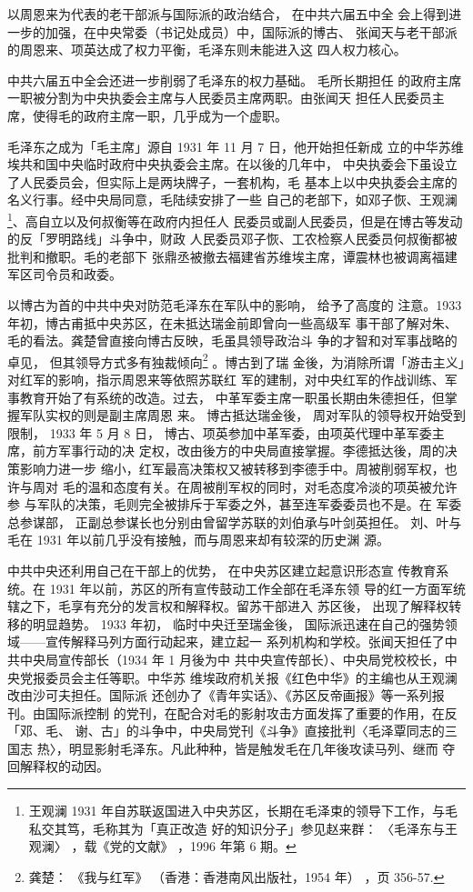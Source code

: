 以周恩来为代表的老干部派与国际派的政治结合，
在中共六届五中全
会上得到进一步的加强，在中央常委（书记处成员）中，国际派的博古、
张闻天与老干部派的周恩来、项英达成了权力平衡，毛泽东则未能进入这
四人权力核心。

中共六届五中全会还进一步削弱了毛泽东的权力基础。
毛所长期担任
的政府主席一职被分割为中央执委会主席与人民委员主席两职。由张闻天
担任人民委员主席，使得毛的政府主席一职，几乎成为一个虚职。

毛泽东之成为「毛主席」源自 1931 年 11 月 7 日，他开始担任新成
立的中华苏维埃共和国中央临时政府中央执委会主席。在以後的几年中，
中央执委会下虽设立了人民委员会，但实际上是两块牌子，一套机构，毛
基本上以中央执委会主席的名义行事。经中央局同意，毛陆续安排了一些
自己的老部下，如邓子恢、王观澜\footnote{ 王观澜 1931 年自苏联返国进入中央苏区，长期在毛泽束的领导下工作，与毛私交其笃，毛称其为「真正改造
好的知识分子」参见赵来群：
〈毛泽东与王观澜〉
，载《党的文献》
，1996 年第 6 期。}、高自立以及何叔衡等在政府内担任人
民委员或副人民委员，但是在博古等发动的反「罗明路线」斗争中，财政
人民委员邓子恢、工农检察人民委员何叔衡都被批判和撤职。毛的老部下
张鼎丞被撤去福建省苏维埃主席，谭震林也被调离福建军区司令员和政委。

以博古为首的中共中央对防范毛泽东在军队中的影响，
给予了高度的
注意。1933 年初，博古甫抵中央苏区，在未抵达瑞金前即曾向一些高级军
事干部了解对朱、毛的看法。龚楚曾直接向博古反映，毛虽具领导政治斗
争的才智和对军事战略的卓见，
但其领导方式多有独裁倾向\footnote{龚楚：
《我与红军》
（香港：香港南风出版社，1954 年）
，页 356-57.} 。博古到了瑞
金後，为消除所谓「游击主义」对红军的影响，指示周恩来等依照苏联红
军的建制，对中央红军的作战训练、军事教育开始了有系统的改造。过去，
中革军委主席一职虽长期由朱德担任，但掌握军队实权的则是副主席周恩
来。
博古抵达瑞金後，
周对军队的领导权开始受到限制，
1933 年 5 月 8 日，
博古、项英参加中革军委，由项英代理中革军委主席，前方军事行动的决
定权，改由後方的中央局直接掌握。李德抵达後，周的决策影响力进一步
缩小，红军最高决策权又被转移到李德手中。周被削弱军权，也许与周对
毛的温和态度有关。在周被削军权的同时，对毛态度冷淡的项英被允许参
与军队的决策，毛则完全被排斥于军委之外，甚至连军委委员也不是。在
军委总参谋部，
正副总参谋长也分别由曾留学苏联的刘伯承与叶剑英担任。
刘、叶与毛在 1931 年以前几乎没有接触，而与周恩来却有较深的历史渊
源。

 
中共中央还利用自己在干部上的优势，
在中央苏区建立起意识形态宣
传教育系统。在 1931 年以前，苏区的所有宣传鼓动工作全部在毛泽东领
导的红一方面军统辖之下，毛享有充分的发言权和解释权。留苏干部进入
苏区後，
出现了解释权转移的明显趋势。
1933 年初，
临时中央迁至瑞金後，
国际派迅速在自己的强势领域——宣传解释马列方面行动起来，建立起一
系列机构和学校。张闻天担任了中共中央局宣传部长（1934 年 1 月後为中
共中央宣传部长）、中央局党校校长，中央党报委员会主任等职。中华苏
维埃政府机关报《红色中华》的主编也从王观澜改由沙可夫担任。国际派
还创办了《青年实话》、《苏区反帝画报》等一系列报刊。由国际派控制
的党刊，在配合对毛的影射攻击方面发挥了重要的作用，在反「邓、毛、
谢、古」的斗争中，中央局党刊《斗争》直接批判〈毛泽覃同志的三国志
热〉，明显影射毛泽东。凡此种种，皆是触发毛在几年後攻读马列、继而
夺回解释权的动因。

